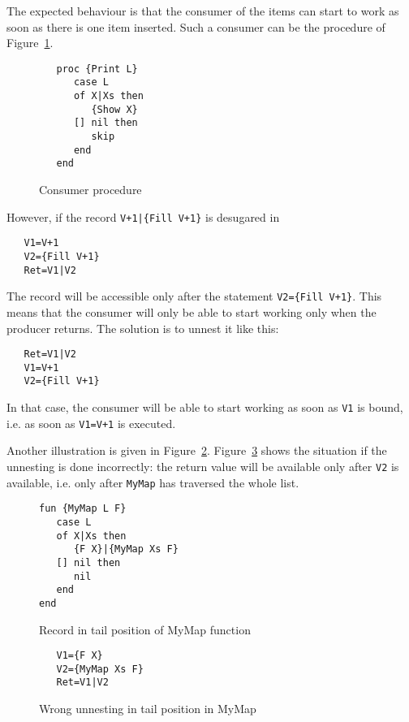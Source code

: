 \documentclass[a4paper]{memoir}
\begin{document}
The expected behaviour is that the consumer of the items can start to work as
soon as there is one item inserted. Such a consumer can be the procedure of
Figure~\ref{fig:unnester:consumer}.
\begin{figure}[h]
\begin{lstlisting}
   proc {Print L}
      case L
      of X|Xs then
         {Show X}
      [] nil then
         skip
      end
   end
\end{lstlisting}
\caption{Consumer procedure}
\label{fig:unnester:consumer}
\end{figure}


However, if the record \lstinline!V+1|{Fill V+1}! is desugared in 
\begin{lstlisting}
   V1=V+1
   V2={Fill V+1}
   Ret=V1|V2
\end{lstlisting}
The record will be accessible only after the statement 
\lstinline!V2={Fill V+1}!. This means that the consumer will only be able to
start working only when the producer returns.
The solution is to unnest it like this:
\begin{lstlisting}
   Ret=V1|V2
   V1=V+1
   V2={Fill V+1}
\end{lstlisting}
In that case, the consumer will be able to start working as soon as
\lstinline!V1! is bound, i.e. as soon as \lstinline!V1=V+1! is executed.

Another illustration is given in Figure~\ref{fig:unnester:mymap}. Figure~\ref{fig:unnester:wrongmymap} shows
the situation if the unnesting is done incorrectly: the return value
will be available only after \lstinline!V2! is available, i.e. only after
\lstinline!MyMap! has
traversed the whole list.

\begin{figure}[h]
\begin{lstlisting}
fun {MyMap L F}
   case L
   of X|Xs then
      {F X}|{MyMap Xs F}
   [] nil then
      nil
   end
end
\end{lstlisting}
\caption{Record in tail position of MyMap function}
\label{fig:unnester:mymap}
\end{figure}


\begin{figure}[h]
\begin{lstlisting}
   V1={F X}
   V2={MyMap Xs F}
   Ret=V1|V2
\end{lstlisting}
\caption{Wrong unnesting in tail position in MyMap}
\label{fig:unnester:wrongmymap}
\end{figure}
\end{document}
